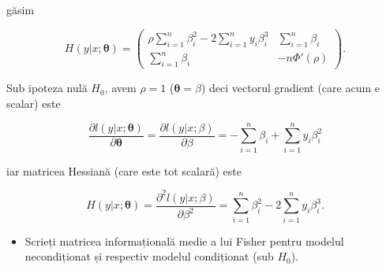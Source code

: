\documentclass[]{article}
\newenvironment{frshaded*}{%
  \def\FrameCommand{\fboxrule=\FrameRule\fboxsep=\FrameSep \fcolorbox{framecolor}{shadecolor1}}%
  \MakeFramed {\advance\hsize-\width \FrameRestore}}%
{\endMakeFramed}
\newenvironment{rmdblock}[1]
  {\begin{frshaded*}
  \begin{itemize}
  \renewcommand{\labelitemi}{
    \raisebox{-.7\height}[0pt][0pt]{
      {\setkeys{Gin}{width=2em,keepaspectratio}\texttt{[image: images/icons/\#1]}}
    }
  }
  \item
  }
  {
  \end{itemize}
  \end{frshaded*}
  }
\newenvironment{rmdexercise}
  {\begin{rmdblock}{exercise}}
  {\end{rmdblock}}
\renewcommand\refname{Referințe}
\begin{document}
găsim

\[
H(y|x;\mathbf{\theta}) = \begin{pmatrix}
  \rho\sum_{i=1}^{n}\beta_i^2 - 2\sum_{i=1}^{n}y_i\beta_i^3 & \sum_{i=1}^{n}\beta_i\\
  \sum_{i=1}^{n}\beta_i & -n\Phi'(\rho)
\end{pmatrix}.
\]

Sub ipoteza nulă \(H_0\), avem \(\rho = 1\)
(\(\mathbf{\theta} = \beta\)) deci vectorul gradient (care acum e
scalar) este

\[
\frac{\partial l(y|x;\mathbf{\theta})}{\partial \mathbf{\theta}} = \frac{\partial l(y|x;\beta)}{\partial \beta} = -\sum_{i=1}^{n}\beta_i + \sum_{i=1}^{n}y_i\beta_i^2
\]

iar matricea Hessiană (care este tot scalară) este

\[
H(y|x;\mathbf{\theta}) = \frac{\partial^2 l(y|x;\beta)}{\partial \beta^2} = \sum_{i=1}^{n}\beta_i^2 - 2\sum_{i=1}^{n}y_i\beta_i^3.
\]

\begin{rmdexercise}
Scrieți matricea informațională medie a lui Fisher pentru modelul
necondiționat și respectiv modelul condiționat (sub \(H_0\)).
\end{rmdexercise}

\renewcommand\refname{Referințe}

\end{document}
